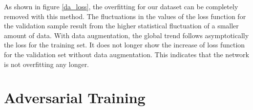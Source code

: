 \documentclass[12pt, a4paper]{thesis}
\begin{document}
As shown in figure \ref{da_loss}, the overfitting for our dataset can
be completely removed with this method.  The fluctuations in the
values of the loss function for the validation sample result from the
higher statistical fluctuation of a smaller amount of data. With data
augmentation, the global trend follows asymptotically the loss for the
training set. It does not longer show the increase of loss function
for the validation set without data augmentation. This indicates that
the network is not overfitting any longer.

\section{Adversarial Training}
\label{sec:org30a0273}

\end{document}

